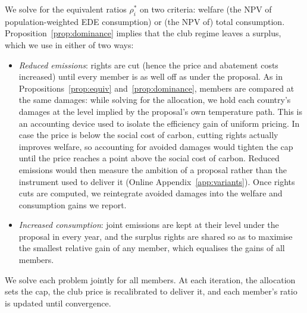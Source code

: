\documentclass[12pt,english]{article}
\theoremstyle{remark}
\begin{document}
We solve for the equivalent ratios $\rho^*_i$ on two criteria: welfare (the NPV of population-weighted EDE consumption) or (the NPV of) total consumption. Proposition~\ref{prop:dominance} implies that the club regime leaves a surplus, which we use in either of two ways:
\begin{itemize}
  \item \emph{Reduced emissions}: rights are cut (hence the price and abatement costs increased) until every member is as well off as under the proposal. %
  As in Propositions~\ref{prop:equiv} and~\ref{prop:dominance}, members are compared at the same damages: while solving for the allocation, we hold each country's damages at the level implied by the proposal's own temperature path. This is an accounting device used to isolate the efficiency gain of uniform pricing. In case the price is below the social cost of carbon, cutting rights actually improves welfare, so accounting for avoided damages would tighten the cap until the price reaches a point above the social cost of carbon. 
  Reduced emissions would then measure the ambition of a proposal rather than the instrument used to deliver it (Online Appendix~\ref{app:variants}). 
  Once rights cuts are computed, we reintegrate avoided damages into the welfare and consumption gains we report. 
  \item \emph{Increased consumption}: joint emissions are kept at their level under the proposal in every year, and the surplus rights are shared so as to maximise the smallest relative gain of any member, which equalises the gains of all members.
\end{itemize}
We solve each problem jointly for all members. At each iteration, the allocation sets the cap, the club price is recalibrated to deliver it, and each member's ratio is updated until convergence. %
\end{document}
